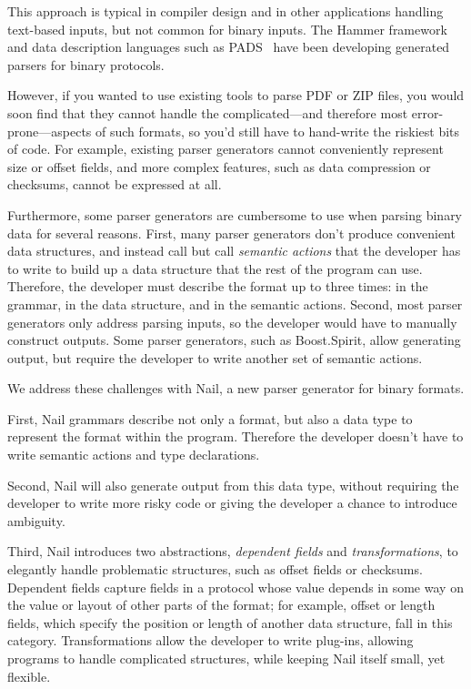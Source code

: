 This approach is typical in compiler design and in other applications handling text-based inputs, but not
common for binary inputs. The Hammer framework~\cite{hammer-parser} and data description languages such as
PADS~\cite{Fisher:2005:PDL:1064978.1065046} have been developing generated parsers for binary protocols.

However, if you wanted to use existing tools to parse PDF
or ZIP files, you would soon find that they cannot handle the complicated---and therefore most
error-prone---aspects of such formats, so you'd still have to
hand-write the riskiest bits of code. For example, existing parser generators cannot conveniently represent size or offset fields, and more complex features, such as data compression or checksums, cannot be expressed at all.

Furthermore, some parser generators are cumbersome to use when parsing binary data for several
reasons. First, many parser generators don't produce convenient data structures, and instead call
but call \emph{semantic actions} that the developer has to write to build up a data structure that
the rest of the program can use. Therefore, the developer must
describe the format up to three times: in the grammar, in the data structure, and in the semantic
actions. Second, most parser generators only address parsing inputs, so the developer would have to manually
construct outputs. Some parser generators, such as 
Boost.Spirit, allow generating output, but require the developer to write another set of semantic actions.

We address these challenges with Nail, a new parser generator for binary formats.

First, Nail grammars describe not only a format, but also a data type to represent the format within the program.
Therefore the developer doesn't have to write semantic actions and type declarations.

Second, Nail will also generate output from this data type, without requiring the developer
to write more risky code or giving the developer a chance to introduce ambiguity.

Third,  Nail introduces two abstractions, \emph{dependent fields} and
\emph{transformations}, to elegantly handle problematic structures,
such as offset fields or checksums.  Dependent fields capture fields
in a protocol whose value depends in some way on the value or layout
of other parts of the format; for example, offset or length fields,
which specify the position or length of another data structure, fall
in this category.  Transformations allow the developer to write plug-ins,
allowing programs to handle complicated structures, while
keeping Nail itself small, yet flexible. 

